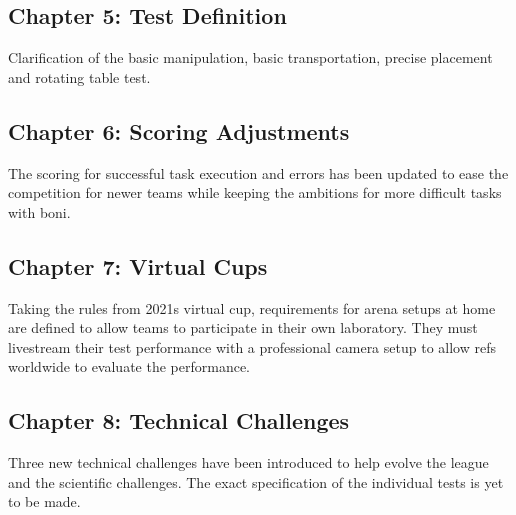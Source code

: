 \subsection{Chapter 5: Test Definition}

Clarification of the basic manipulation, basic transportation, precise placement and rotating table test.


\subsection{Chapter 6: Scoring Adjustments}

The scoring for successful task execution and errors has been updated to ease the competition for newer teams while keeping the ambitions for more difficult tasks with boni.

\subsection{Chapter 7: Virtual Cups}

Taking the rules from 2021s virtual cup, 
requirements for arena setups at home are defined to allow teams to participate in their own laboratory.
They must livestream their test performance with a professional camera setup to allow refs worldwide to evaluate the performance.

\subsection{Chapter 8: Technical Challenges}

Three new technical challenges have been introduced to help evolve the league and the scientific challenges. 
The exact specification of the individual tests is yet to be made.
	
